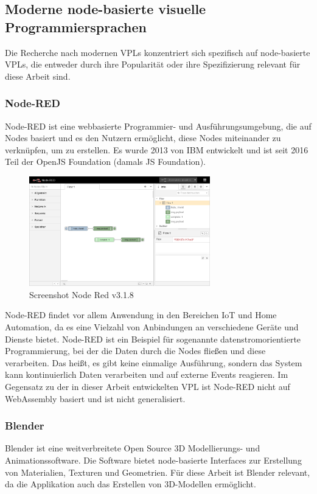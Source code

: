 \documentclass[ngerman]{article}
\begin{document}
\subsection{Moderne node-basierte visuelle Programmiersprachen}
Die Recherche nach modernen VPLs konzentriert sich spezifisch auf node-basierte VPLs, die entweder durch ihre Popularität oder ihre Spezifizierung relevant für diese Arbeit sind.

\subsubsection{Node-RED}

Node-RED ist eine webbasierte Programmier- und Ausführungsumgebung, die auf Nodes basiert und es den Nutzern ermöglicht, diese Nodes miteinander zu verknüpfen, um  zu erstellen. 
Es wurde 2013 von IBM entwickelt und ist seit 2016 Teil der OpenJS Foundation (damals JS Foundation).
\cite{nodered}

\begin{figure}[htbp]
  \centering
  \includegraphics[width=0.7\textwidth]{./graphics/node-red-3_1_8.png}
  \caption{Screenshot Node Red v3.1.8}
  \label{fig:node_red}
\end{figure}

Node-RED findet vor allem Anwendung in den Bereichen IoT und Home Automation, da es eine Vielzahl von Anbindungen an verschiedene Geräte und Dienste bietet. 
Node-RED ist ein Beispiel für sogenannte datenstromorientierte Programmierung, bei der die Daten durch die Nodes fließen und diese verarbeiten. Das heißt, es gibt keine einmalige Ausführung, sondern das System kann kontinuierlich Daten verarbeiten und auf externe Events reagieren. Im Gegensatz zu der in dieser Arbeit entwickelten VPL ist Node-RED nicht auf WebAssembly basiert und ist nicht generalisiert.


\pagebreak
\subsubsection{Blender}
Blender ist eine weitverbreitete Open Source 3D Modellierungs- und Animationssoftware. Die Software bietet node-basierte Interfaces zur Erstellung von Materialien, Texturen und Geometrien. 
\cite{blender}
Für diese Arbeit ist Blender relevant, da die Applikation auch das Erstellen von 3D-Modellen ermöglicht.
\end{document}
